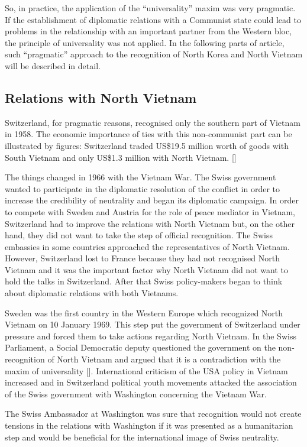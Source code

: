 \documentclass[a4paper]{article}
\begin{document}
So, in practice, the application of the “universality” maxim was very pragmatic. If the establishment of diplomatic relations with a Communist state could lead to problems in the relationship with an important partner from the Western bloc, the principle of universality was not applied. In the following parts of article, such “pragmatic” approach to the recognition of North Korea and North Vietnam will be described in detail.
\subsection{Relations with North Vietnam}
Switzerland, for pragmatic reasons, recognised only the southern part of Vietnam in 1958. The economic importance of ties with this non-communist part can be illustrated by figures: Switzerland traded US\$19.5 million worth of goods with South Vietnam and only US\$1.3 million with North Vietnam. []

The things changed in 1966 with the Vietnam War. The Swiss government wanted to participate in the diplomatic resolution of the conflict in order to increase the credibility of neutrality and began its diplomatic campaign. In order to compete with Sweden and Austria for the role of peace mediator in Vietnam, Switzerland had to improve the relations with North Vietnam but, on the other hand, they did not want to take the step of official recognition. The Swiss embassies in some countries approached the representatives of North Vietnam. However, Switzerland lost to France because they had not recognised North Vietnam and it was the important factor why North Vietnam did not want to hold the talks in Switzerland. After that Swiss policy-makers began to think about diplomatic relations with both Vietnams.

Sweden was the first country in the Western Europe which recognized North Vietnam on 10 January 1969. This step put the government of Switzerland under pressure and forced them to take actions regarding North Vietnam. In the Swiss Parliament, a Social Democratic deputy questioned the government on the non-recognition of North Vietnam and argued that it is a contradiction with the maxim of universality []. International criticism of the USA policy in Vietnam increased and in Switzerland political youth movements attacked the association of the Swiss government with Washington concerning the Vietnam War.

The Swiss Ambassador at Washington was sure that recognition would not create tensions in the relations with Washington if it was presented as a humanitarian step and would be beneficial for the international image of Swiss neutrality.
\end{document}
